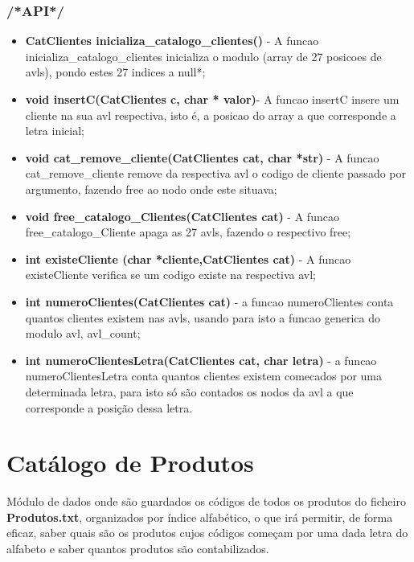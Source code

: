 \subsubsection{/*API*/}
\begin{itemize}

\item \textbf{CatClientes inicializa\_catalogo\_clientes()} - A funcao inicializa\_catalogo\_clientes inicializa o modulo (array de 27 posicoes de avls), pondo estes 27 indices a null*; 

\item \textbf{void insertC(CatClientes c, char * valor)}- A funcao insertC insere um cliente na sua avl respectiva, isto é, a posicao do array a que corresponde a letra inicial; 

\item \textbf{void cat\_remove\_cliente(CatClientes cat, char *str)} - A funcao cat\_remove\_cliente remove da respectiva avl o codigo de cliente passado por argumento, fazendo free ao nodo onde este situava; 

\item \textbf{void free\_catalogo\_Clientes(CatClientes cat)} - A funcao free\_catalogo\_Cliente apaga as 27 avls, fazendo o respectivo free; 

\item \textbf{int existeCliente (char *cliente,CatClientes cat)} - A funcao existeCliente verifica se um codigo existe na respectiva avl;

\item \textbf{int numeroClientes(CatClientes cat)} - a funcao numeroClientes conta quantos clientes existem nas avls, usando para isto a funcao generica do modulo avl, avl\_count;

\item \textbf{int numeroClientesLetra(CatClientes cat, char letra)} - a funcao numeroClientesLetra conta quantos clientes existem comecados por uma determinada letra, para isto só são contados os nodos da avl a que corresponde a posição dessa letra. 

\end{itemize}

\section{Catálogo de Produtos}

 Módulo de dados onde são guardados os códigos de todos os produtos do ficheiro \textbf{Produtos.txt}, organizados por índice alfabético, o que irá permitir, de forma eficaz, saber quais são os produtos cujos códigos começam por uma dada letra do alfabeto e saber quantos produtos são contabilizados. 


